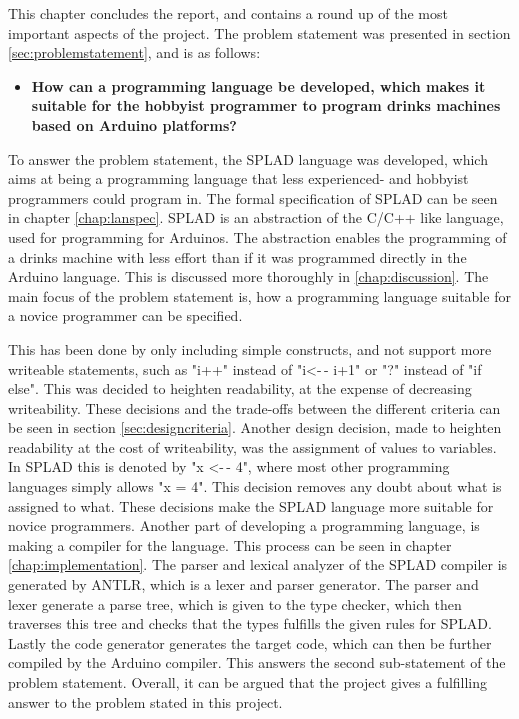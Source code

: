\label{chap:konklusion}
This chapter concludes the report, and contains a round up of the most important aspects of the project.
The problem statement was presented in section \ref{sec:problemstatement}, and is as follows: 
\begin{itemize}
	\item \textbf{How can a programming language be developed, which makes it suitable for the hobbyist programmer to program drinks machines based on Arduino platforms?}
\end{itemize}

To answer the problem statement, the SPLAD language was developed, which aims at being a programming language that less experienced- and hobbyist programmers could program in. The formal specification of SPLAD can be seen in chapter \ref{chap:lanspec}. SPLAD is an abstraction of the C/C++ like language, used for programming for Arduinos. The abstraction enables the programming of a drinks machine with less effort than if it was programmed directly in the Arduino language. This is discussed more thoroughly in \ref{chap:discussion}. The main focus of the problem statement is, how a programming language suitable for a novice programmer can be specified.

This has been done by only including simple constructs, and not support more writeable statements, such as "i++" instead of "i<-$\,$- i+1" or "?" instead of "if else". This was decided to heighten readability, at the expense of decreasing writeability. These decisions and the trade-offs between the different criteria can be seen in section \ref{sec:designcriteria}. Another design decision, made to heighten readability at the cost of writeability, was the assignment of values to variables. In SPLAD this is denoted by "x <-$\,$- 4", where most other programming languages simply allows "x = 4". This decision removes any doubt about what is assigned to what. These decisions make the SPLAD language more suitable for novice programmers.
Another part of developing a programming language, is making a compiler for the language. This process can be seen in chapter \ref{chap:implementation}. The parser and lexical analyzer of the SPLAD compiler is generated by ANTLR, which is a lexer and parser generator. The parser and lexer generate a parse tree, which is given to the type checker, which then traverses this tree and checks that the types fulfills the given rules for SPLAD. Lastly the code generator generates the target code, which can then be further compiled by the Arduino compiler. This answers the second sub-statement of the problem statement. Overall, it can be argued that the project gives a fulfilling answer to the problem stated in this project. 